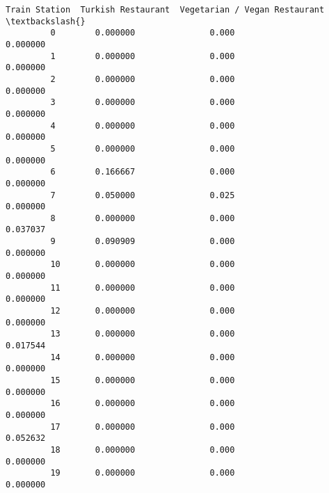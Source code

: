 \documentclass[11pt]{article}
\begin{document}
\begin{Verbatim}[commandchars=\\\{\}]
             Train Station  Turkish Restaurant  Vegetarian / Vegan Restaurant  \textbackslash{}
         0        0.000000               0.000                       0.000000   
         1        0.000000               0.000                       0.000000   
         2        0.000000               0.000                       0.000000   
         3        0.000000               0.000                       0.000000   
         4        0.000000               0.000                       0.000000   
         5        0.000000               0.000                       0.000000   
         6        0.166667               0.000                       0.000000   
         7        0.050000               0.025                       0.000000   
         8        0.000000               0.000                       0.037037   
         9        0.090909               0.000                       0.000000   
         10       0.000000               0.000                       0.000000   
         11       0.000000               0.000                       0.000000   
         12       0.000000               0.000                       0.000000   
         13       0.000000               0.000                       0.017544   
         14       0.000000               0.000                       0.000000   
         15       0.000000               0.000                       0.000000   
         16       0.000000               0.000                       0.000000   
         17       0.000000               0.000                       0.052632   
         18       0.000000               0.000                       0.000000   
         19       0.000000               0.000                       0.000000   
         

\end{Verbatim}
\end{document}
